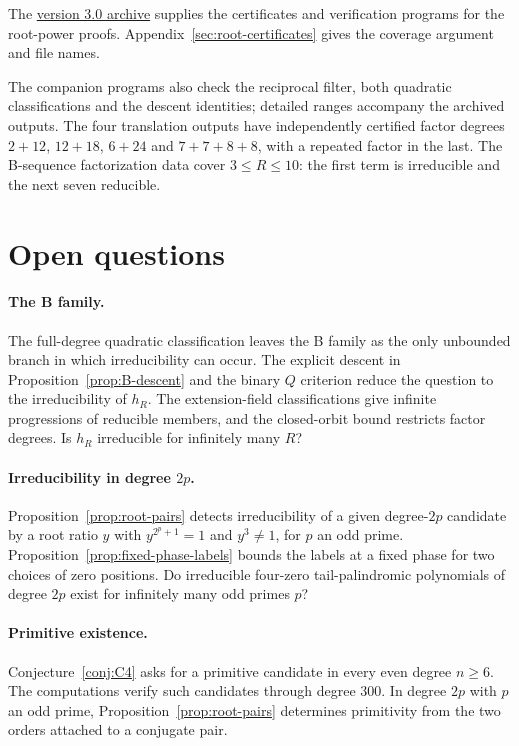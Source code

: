 \documentclass[11pt]{article}
\theoremstyle{definition}
\theoremstyle{remark}
\begin{document}
The \href{https://doi.org/10.5281/zenodo.23880299}{version 3.0 archive}
supplies the certificates and verification programs for the root-power
proofs. Appendix~\ref{sec:root-certificates} gives the coverage argument
and file names.

The companion programs also check the reciprocal filter, both quadratic
classifications and the descent identities; detailed ranges accompany
the archived outputs.
The four translation outputs have independently certified factor degrees
$2+12$, $12+18$, $6+24$ and $7+7+8+8$, with a repeated factor in the last.
The B-sequence factorization data cover $3\le R\le10$:
the first term is irreducible and the next seven reducible.

\section{Open questions}\label{sec:limits}
\paragraph{The B family.}
The full-degree quadratic classification leaves the B family
as the only unbounded branch in which irreducibility can occur.
The explicit descent in Proposition~\ref{prop:B-descent} and
the binary $Q$ criterion reduce the question to the irreducibility
of $h_R$. The extension-field classifications give infinite
progressions of reducible members, and the closed-orbit bound
restricts factor degrees. Is $h_R$ irreducible for infinitely
many $R$?

\paragraph{Irreducibility in degree $2p$.}
Proposition~\ref{prop:root-pairs} detects irreducibility of a
given degree-$2p$ candidate by a root ratio $y$ with
$y^{2^p+1}=1$ and $y^3\ne1$, for $p$ an odd prime.
Proposition~\ref{prop:fixed-phase-labels} bounds the labels
at a fixed phase for two choices of zero positions. Do irreducible
four-zero tail-palindromic polynomials of degree $2p$ exist for
infinitely many odd primes $p$?

\paragraph{Primitive existence.}
Conjecture~\ref{conj:C4} asks for a primitive candidate in
every even degree $n\ge6$. The computations verify such
candidates through degree $300$. In degree $2p$ with $p$ an
odd prime, Proposition~\ref{prop:root-pairs} determines
primitivity from the two orders attached to a conjugate pair.
\end{document}
